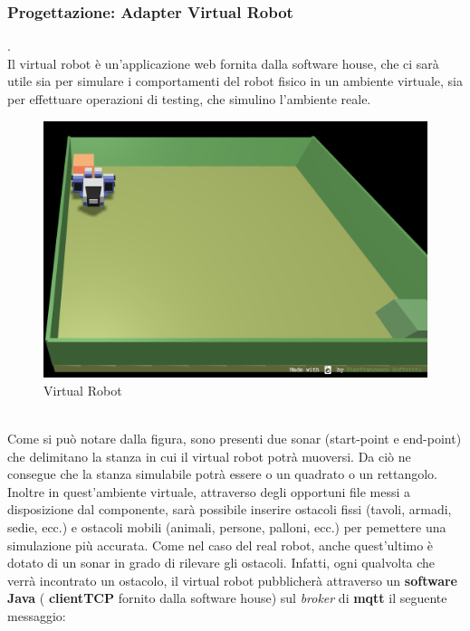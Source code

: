 \documentclass{llncs}
\newcommand{\java}{\textsf{Java }}
\begin{document}
\subsubsection{Progettazione: Adapter Virtual Robot}.
\label{ProgettazioneReq1VR}
\vspace*{1ex}
\\
Il virtual robot \`e un'applicazione web fornita dalla software house, che ci sar\`a utile sia per simulare i comportamenti del robot fisico in un ambiente virtuale, sia per effettuare operazioni di testing, che simulino l'ambiente reale.\\
\begin{figure}
    \includegraphics[width=1\textwidth]{Immagini/VirtualRobot.png}
    \caption{Virtual Robot}
    \label{fig:my_label}
\end{figure}
\vspace*{1ex}
\\
Come si pu\`o notare dalla figura, sono presenti due sonar (start-point e end-point) che delimitano la stanza in cui il virtual robot potr\`a muoversi. Da ci\`o ne consegue che la stanza simulabile potr\`a essere o un quadrato o un rettangolo.\\
Inoltre in quest'ambiente virtuale, attraverso degli opportuni file messi a disposizione dal componente, sar\`a possibile inserire ostacoli fissi (tavoli, armadi, sedie, ecc.) e ostacoli mobili (animali, persone, palloni, ecc.) per pemettere una simulazione pi\`u accurata.
Come nel caso del real robot, anche quest'ultimo \`e dotato di un sonar in grado di rilevare gli ostacoli. Infatti, ogni qualvolta che verr\`a incontrato un ostacolo, il virtual robot pubblicher\`a attraverso un \textbf{software \java} ( \textbf{clientTCP} fornito dalla software house) sul \textit{broker} di \textbf{mqtt} il seguente messaggio:
\end{document}
